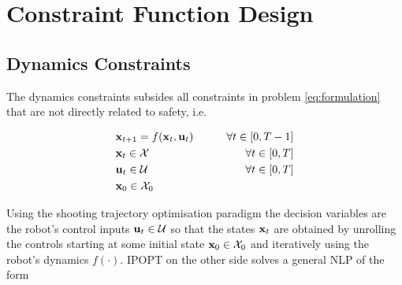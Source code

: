  

\section{Constraint Function Design}
\label{text:approach/constraint}

\subsection{Dynamics Constraints}
\label{text:approach/constraint/dynamics}
The dynamics constraints subsides all constraints in problem \ref{eq:formulation} that are not directly related to safety, i.e. 

\begin{align}
\label{eq:constraint_f}
&\mathbf{x}_{t+1} = f(\mathbf{x}_t, \mathbf{u}_t) \qquad& \forall t \in [0, T - 1] \\
\label{eq:constraint_x}
&\mathbf{x}_t \in \mathcal{X} & \forall t \in [0, T]\\
\label{eq:constraint_u}
&\mathbf{u}_t \in \mathcal{U} & \forall t \in [0, T]\\
\label{eq:constraint_x0}
&\mathbf{x}_0 \in \mathcal{X}_0
\end{align}

Using the shooting trajectory optimisation paradigm the decision variables are the robot's control inputs  $\mathbf{u}_t \in \mathcal{U}$ so that the states $\mathbf{x}_t$ are obtained by unrolling the controls starting at some initial state $\mathbf{x}_0 \in \mathcal{X}_0$ and iteratively using the robot's dynamics $f(\cdot)$. \ac{IPOPT} on the other side solves a general \ac{NLP} of the form \cite{Wachter2006} \\

